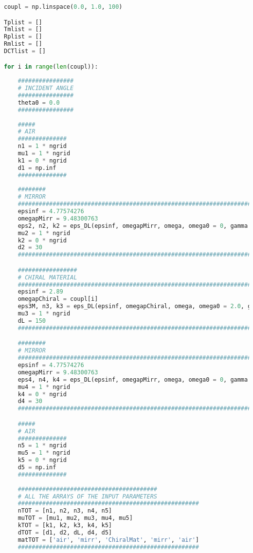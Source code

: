 \documentclass[aps,prl,10pt,onecolumn,superscriptaddress]{revtex4-2}
\begin{document}
\begin{lstlisting}[language=Python, caption=Layers of a standard FP.]
coupl = np.linspace(0.0, 1.0, 100)

Tplist = []
Tmlist = []
Rplist = []
Rmlist = []
DCTlist = []

for i in range(len(coupl)):
 
    ################
    # INCIDENT ANGLE
    ################
    theta0 = 0.0
    ################
    
    #####
    # AIR
    ##############
    n1 = 1 * ngrid
    mu1 = 1 * ngrid
    k1 = 0 * ngrid
    d1 = np.inf
    ##############
    
    ########
    # MIRROR
    ########################################################################################
    epsinf = 4.77574276
    omegapMirr = 9.48300763
    eps2, n2, k2 = eps_DL(epsinf, omegapMirr, omega, omega0 = 0, gamma = 0.17486845, k0 = 0)
    mu2 = 1 * ngrid
    k2 = 0 * ngrid
    d2 = 30
    ########################################################################################   

    #################
    # CHIRAL MATERIAL
    ##########################################################################################
    epsinf = 2.89
    omegapChiral = coupl[i]
    eps3M, n3, k3 = eps_DL(epsinf, omegapChiral, omega, omega0 = 2.0, gamma = 0.05, k0 = 1e-3)
    mu3 = 1 * ngrid
    dL = 150
    ########################################################################################## 

    ########
    # MIRROR
    ########################################################################################
    epsinf = 4.77574276
    omegapMirr = 9.48300763
    eps4, n4, k4 = eps_DL(epsinf, omegapMirr, omega, omega0 = 0, gamma = 0.17486845, k0 = 0)
    mu4 = 1 * ngrid
    k4 = 0 * ngrid
    d4 = 30
    ######################################################################################## 

    #####
    # AIR
    ##############
    n5 = 1 * ngrid
    mu5 = 1 * ngrid
    k5 = 0 * ngrid
    d5 = np.inf
    ##############
    
    ########################################
    # ALL THE ARRAYS OF THE INPUT PARAMETERS
    ####################################################
    nTOT = [n1, n2, n3, n4, n5]
    muTOT = [mu1, mu2, mu3, mu4, mu5]
    kTOT = [k1, k2, k3, k4, k5] 
    dTOT = [d1, d2, dL, d4, d5] 
    matTOT = ['air', 'mirr', 'ChiralMat', 'mirr', 'air']
    ####################################################
    

\end{lstlisting}
\end{document}
